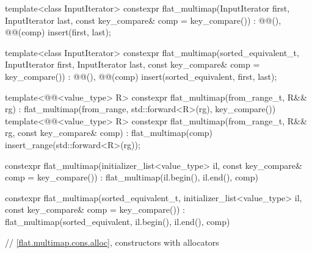 \begin{codeblock}
{{    template<class InputIterator>
      constexpr flat_multimap(InputIterator first, InputIterator last,
                              const key_compare& comp = key_compare())
        : @@(), @@(comp)
        { insert(first, last); }

    template<class InputIterator>
      constexpr flat_multimap(sorted_equivalent_t, InputIterator first, InputIterator last,
                              const key_compare& comp = key_compare())
        : @@(), @@(comp) { insert(sorted_equivalent, first, last); }

    template<@@<value_type> R>
      constexpr flat_multimap(from_range_t, R&& rg)
        : flat_multimap(from_range, std::forward<R>(rg), key_compare()) { }
    template<@@<value_type> R>
      constexpr flat_multimap(from_range_t, R&& rg, const key_compare& comp)
        : flat_multimap(comp) { insert_range(std::forward<R>(rg)); }

    constexpr flat_multimap(initializer_list<value_type> il,
                            const key_compare& comp = key_compare())
        : flat_multimap(il.begin(), il.end(), comp) { }

    constexpr flat_multimap(sorted_equivalent_t, initializer_list<value_type> il,
                            const key_compare& comp = key_compare())
        : flat_multimap(sorted_equivalent, il.begin(), il.end(), comp) { }

    // \ref{flat.multimap.cons.alloc}, constructors with allocators

}}
\end{codeblock}
